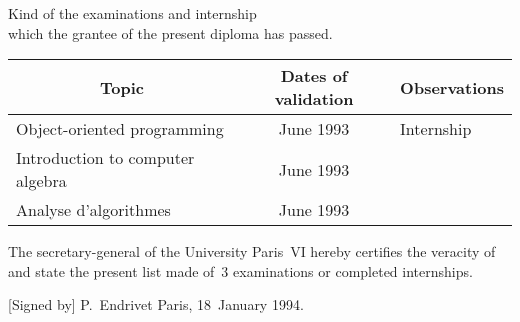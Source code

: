 \documentclass[a4paper,11pt,twoside]{article}
\begin{document}
\begin{center}
\sc Kind of the examinations and internship\\
which the grantee of the present diploma has passed.
\end{center}

\medskip

\begin{center}
\begin{tabular}{|l|c|l|}
\hline
\multicolumn{1}{|c|}{Topic} & Dates of validation & Observations\\
\hline
Object-oriented programming & June 1993 & Internship\\
Introduction to computer algebra & June 1993 & \\
Analyse d'algorithmes & June 1993 &\\
\hline
\end{tabular}
\end{center}

\medskip

The secretary-general of the University Paris~VI hereby certifies the
veracity of and state the present list made of~3 examinations or
completed internships.

\medskip

[Signed by] P.~Endrivet \hfill Paris, 18~January 1994.
\end{document}
